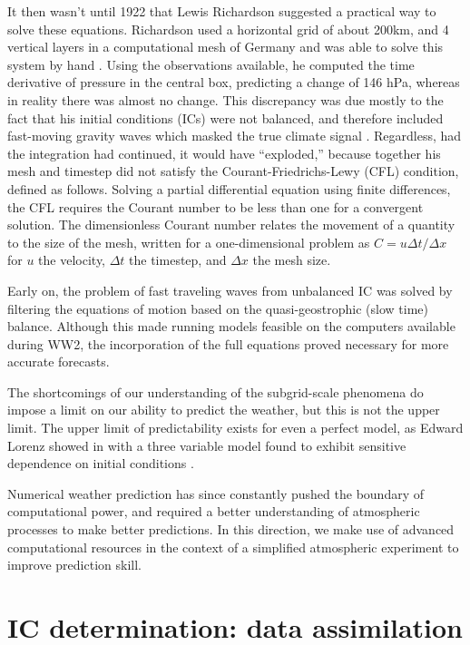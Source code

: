 \documentclass[12pt]{report}
\begin{document}
It then wasn't until 1922 that Lewis Richardson suggested a practical way to solve these equations.
Richardson used a horizontal grid of about 200km, and 4 vertical layers in a computational mesh of Germany and was able to solve this system by hand .
Using the observations available, he computed the time derivative of pressure in the central box, predicting a change of 146 hPa, whereas in reality there was almost no change.
This discrepancy was due mostly to the fact that his initial conditions (ICs) were not balanced, and therefore included fast-moving gravity waves which masked the true climate signal .
Regardless, had the integration had continued, it would have ``exploded,'' because together his mesh and timestep did not satisfy the Courant-Friedrichs-Lewy (CFL) condition, defined as follows.
Solving a partial differential equation using finite differences, the CFL requires the Courant number to be less than one for a convergent solution.
The dimensionless Courant number relates the movement of a quantity to the size of the mesh, written for a one-dimensional problem as $C = u \Delta t/\Delta x $ for $u$ the velocity, $\Delta t$ the timestep, and $\Delta x$ the mesh size.

Early on, the problem of fast traveling waves from unbalanced IC was solved by filtering the equations of motion based on the quasi-geostrophic (slow time) balance.
Although this made running models feasible on the computers available during WW2, the incorporation of the full equations proved necessary for more accurate forecasts.

The shortcomings of our understanding of the subgrid-scale phenomena do impose a limit on our ability to predict the weather, but this is not the upper limit.
The upper limit of predictability exists for even a perfect model, as Edward Lorenz showed in with a three variable model found to exhibit sensitive dependence on initial conditions .

Numerical weather prediction has since constantly pushed the boundary of computational power, and required a better understanding of atmospheric processes to make better predictions.
In this direction, we make use of advanced computational resources in the context of a simplified atmospheric experiment to improve prediction skill.

\section{IC determination: data assimilation}
\end{document}
